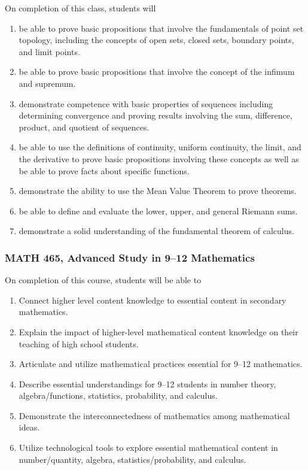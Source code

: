\documentclass[11pt]{article}
\newenvironment{alphalist}{
\begin{enumerate}[label=(\arabic*),widest=107 ,leftmargin=25pt, itemsep=0pt]}
{\end{enumerate}}
\begin{document}
On completion of this class, students will
\begin{alphalist}
    \item be able to prove basic propositions that involve the fundamentals of point set topology, including the concepts of open sets, closed sets, boundary points, and limit points.
     \item be able to prove basic propositions that involve the concept of the infimum and supremum. 
    \item demonstrate competence with basic properties of sequences including determining convergence and proving results involving the sum, difference, product, and quotient of sequences.
    \item be able to use the definitions of continuity, uniform continuity, the limit, and the derivative to prove basic propositions involving these concepts as well as be able to prove facts about specific functions.
    \item demonstrate the ability to use the Mean Value Theorem to prove theorems. 
    \item be able to define and evaluate the lower, upper, and general Riemann sums.
    \item demonstrate a solid understanding of the fundamental theorem of calculus.
\end{alphalist}

\subsubsection{MATH 465, Advanced Study in 9--12 Mathematics}

On  completion of this course, students will be able to
\begin{alphalist}

\item Connect higher level content knowledge to essential content in secondary mathematics.
\item Explain the impact of higher-level mathematical content knowledge on their teaching of high school students.
\item Articulate and utilize mathematical practices essential for 9--12 mathematics.
\item Describe essential understandings for 9--12 students in number theory, algebra/functions, statistics, probability, and calculus.
\item Demonstrate the interconnectedness of mathematics among mathematical ideas.
\item Utilize technological tools to explore essential mathematical content in number/quantity, algebra, statistics/probability, and calculus.
\end{alphalist}
\end{document}
